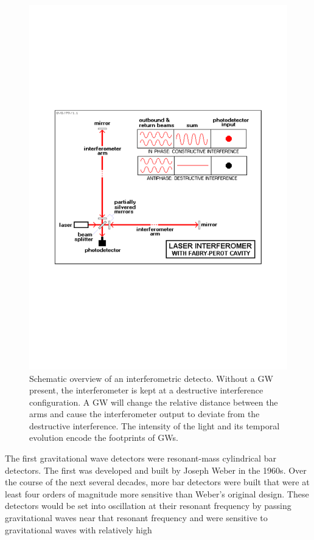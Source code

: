 \documentclass[binding=0.6cm, LaM]{sapthesis}
\begin{document}
\begin{figure}
\includegraphics[scale=0.55]{spot}
\centering
\caption{Schematic overview of an interferometric detecto. Without a GW present, the interferometer is kept at a destructive interference configuration. 
A GW will change the relative distance between the arms and cause the interferometer output to deviate from the destructive interference.
 The intensity of the light and its temporal evolution encode the footprints of GWs.}
\label{fig:spot}
\end{figure}
The first gravitational wave detectors were resonant-mass cylindrical bar detectors. The first was developed and built by Joseph Weber in the 1960s. 
Over the course of the next several decades, more bar detectors were built that were at least four orders of magnitude more sensitive than Weber’s original design. 
These detectors would be set into oscillation at their resonant frequency by passing gravitational waves near that resonant frequency and were sensitive to gravitational waves with relatively high
\end{document}
